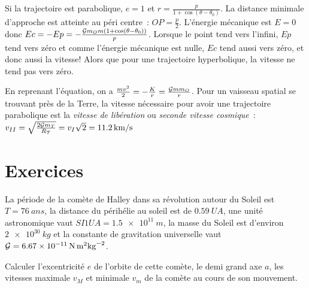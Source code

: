 Si la trajectoire est parabolique, \(e=1\) et \(r =
\frac{p}{1+\cos(\theta-\theta_0)}\). La distance minimale d'approche est %
atteinte au péri centre~: \(OP = \frac{p}{2}\). L'énergie mécanique est \(E=0\)
donc \(Ec = -Ep = -\frac{\mathcal{G} m_O m(1+\cos(\theta - \theta_0))}{p}\). Lorsque le
point tend vers l'infini, \(Ep\) tend vers zéro et comme l'énergie mécanique
est nulle, \(Ec\) tend aussi vers zéro, et donc aussi la vitesse!
Alors que pour une trajectoire hyperbolique, la vitesse ne tend pas vers zéro.

En reprenant l'équation, on a \(\frac{mv^2}{2} = -\frac{K}{r} = \frac{\mathcal{G} m
m_O}{r}\). Pour un vaisseau spatial se trouvant près de la Terre, la vitesse
nécessaire pour avoir une trajectoire parabolique est la \emph{vitesse de
libération} ou \emph{seconde vitesse cosmique}~: \(v_{II} = \sqrt{\frac{2\mathcal{G}
m_T}{R_T}} = v_{I} \sqrt{2} = \qty{11.2}{km/s}\)

\section{Exercices}%
\begin{exercice}%
  La période de la comète de Halley dans sa révolution autour du Soleil est \(T
  = \SI{76}{ans}\), la distance du périhélie au soleil est de
  \(\SI{0.59}{UA}\), une unité astronomique vaut \(SI{1}{UA} =
  \SI{1.5e11}{m}\), la masse du Soleil est d'environ \(\SI{2e30}{kg}\) et la
  constante de gravitation universelle vaut \(\mathcal{G} =
  \SI{6.67e-11}{N.m^2kg^{-2}}\).

  Calculer l'excentricité \(e\) de l'orbite de cette comète, le demi grand axe
  \(a\), les vitesses maximale \(v_M\) et minimale \(v_m\) de la comète au
  cours de son mouvement.
\end{exercice}

